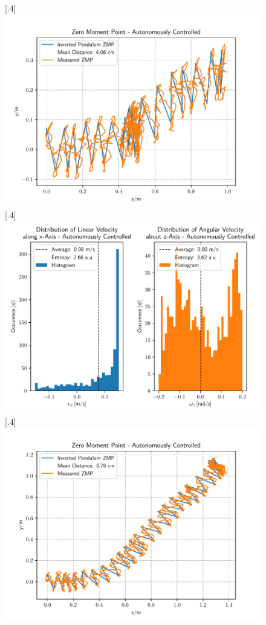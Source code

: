 \begin{figure}[h]
	\centering
	[.4\linewidth]{\includegraphics[scale=.35]{chapters/05_experiments/02_autonomous_walking/dynamic_walk_01_zmp.pdf}}
	[.4\linewidth]{\includegraphics[scale=.35]{chapters/05_experiments/02_autonomous_walking/dynamic_walk_01_entropy.pdf}}
	[.4\linewidth]{\includegraphics[scale=.35]{chapters/05_experiments/02_autonomous_walking/semantic_walk_01_zmp.pdf}}

\end{figure}
